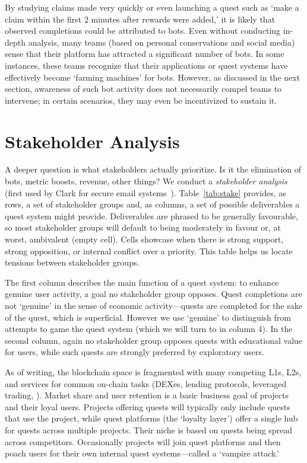 By studying claims made very quickly or even launching a quest such as `make a claim within the first 2 minutes after rewards were added,' it is likely that observed completions could be attributed to bots. Even without conducting in-depth analysis, many teams (based on personal conservations and social media) sense that their platform has attracted a significant number of bots. In some instances, these teams recognize that their applications or quest systems have effectively become `farming machines' for bots. However, as discussed in the next section, awareness of such bot activity does not necessarily compel teams to intervene; in certain scenarios, they may even be incentivized to sustain it.


\section{Stakeholder Analysis} 



A deeper question is what stakeholders actually prioritize. Is it the elimination of bots, metric boosts, revenue, other things? We conduct a \textit{stakeholder analysis} (first used by Clark \etal for secure email systems~\cite{CvORSZ21}). Table~\ref{tab:stake} provides, as rows, a set of stakeholder groups and, as columns, a set of possible deliverables a quest system might provide. Deliverables are phrased to be generally favourable, so most stakeholder groups will default to being moderately in favour or, at worst, ambivalent (empty cell). Cells showcase when there is strong support, strong opposition, or internal conflict over a priority. This table helps us locate tensions between stakeholder groups.

The first column describes the main function of a quest system: to enhance genuine user activity, a goal no stakeholder group opposes. Quest completions are not `genuine' in the sense of economic activity---quests are completed for the sake of the quest, which is superficial. However we use `genuine' to distinguish from attempts to game the quest system (which we will turn to in column 4). In the second column, again no stakeholder group opposes quests with educational value for users, while such quests are strongly preferred by exploratory users.

As of writing, the blockchain space is fragmented with many competing L1s, L2s, and services for common on-chain tasks (\eg DEXes, lending protocols, leveraged trading, \etc). Market share and user retention is a basic business goal of projects and their loyal users. Projects offering quests will typically only include quests that use the project, while quest platforms (the `loyalty layer') offer a single hub for quests across multiple projects. Their niche is based on quests being spread across competitors. Occasionally projects will join quest platforms and then poach users for their own internal quest systems---called a `vampire attack.'

